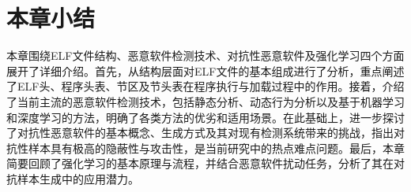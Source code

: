 \section{本章小结}

本章围绕ELF文件结构、恶意软件检测技术、对抗性恶意软件及强化学习四个方面展开了详细介绍。首先，从结构层面对ELF文件的基本组成进行了分析，重点阐述了ELF头、程序头表、节区及节头表在程序执行与加载过程中的作用。接着，介绍了当前主流的恶意软件检测技术，包括静态分析、动态行为分析以及基于机器学习和深度学习的方法，明确了各类方法的优劣和适用场景。在此基础上，进一步探讨了对抗性恶意软件的基本概念、生成方式及其对现有检测系统带来的挑战，指出对抗性样本具有极高的隐蔽性与攻击性，是当前研究中的热点难点问题。最后，本章简要回顾了强化学习的基本原理与流程，并结合恶意软件扰动任务，分析了其在对抗样本生成中的应用潜力。


